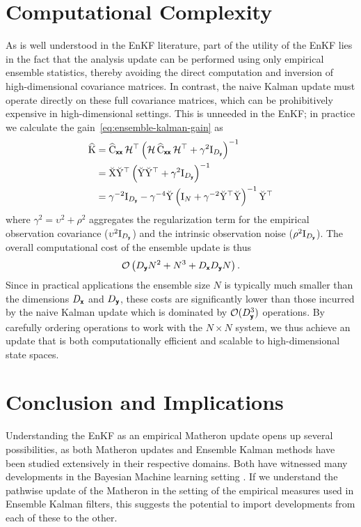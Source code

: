 \documentclass[wcp]{jmlr} %
\begin{document}
\section{Computational Complexity}
As is well understood in the EnKF literature, part of the  utility  of the EnKF lies in the fact that the analysis update can be performed using only empirical ensemble statistics, thereby avoiding the direct computation and inversion of high-dimensional covariance matrices.
In contrast, the naive Kalman update must operate directly on these full covariance matrices, which can be prohibitively expensive in high-dimensional settings.
This is unneeded in the EnKF; in practice we calculate the gain~\eqref{eq:ensemble-kalman-gain} as
\begin{align}
    \widehat{\mathrm{K}}&= \widehat{\mathrm{C}}_{\boldsymbol{\mathsf{xx}}}\, \mathcal{H}^\top \left(\mathcal{H}\,\widehat{\mathrm{C}}_{\boldsymbol{\mathsf{xx}}}\,\mathcal{H}^\top + \gamma^2\mathrm{I}_{D_{\boldsymbol{\mathsf{y}}}}\right)^{-1}\\
    &= \breve{\mathrm{X}} \breve{\mathrm{Y}}^\top   \left(
        \breve{\mathrm{Y}} \breve{\mathrm{Y}}^\top + \gamma^2 \mathrm{I}_{D_{\boldsymbol{\mathsf{y}}}}
    \right)^{-1}\\
    &= \gamma^{-2}\mathrm{I}_{D_{\boldsymbol{\mathsf{y}}}}
    - \gamma^{-4}\breve{\mathrm{Y}}
    \left(
        \mathrm{I}_N + \gamma^{-2}\breve{\mathrm{Y}}^\top\breve{\mathrm{Y}}
    \right)^{-1}
    \breve{\mathrm{Y}}^\top
\end{align}
where \(\gamma^2 = \upsilon^2 + \rho^2\) aggregates the regularization term for the empirical observation covariance (\(\upsilon^2\mathrm{I}_{D_{\boldsymbol{\mathsf{y}}}}\)) and the intrinsic observation noise (\(\rho^2\mathrm{I}_{D_{\boldsymbol{\mathsf{y}}}}\)).
%
The overall computational cost of the ensemble update is thus
\[
    \mathcal{O}\left(D_{\boldsymbol{\mathsf{y}}}N^2 + N^3 + D_{\boldsymbol{\mathsf{x}}}D_{\boldsymbol{\mathsf{y}}}N\right).
\]
Since in practical applications the ensemble size \(N\) is typically much smaller than the dimensions \(D_{\boldsymbol{\mathsf{x}}}\) and \(D_{\boldsymbol{\mathsf{y}}}\), these costs are significantly lower than those incurred by the naive Kalman update which is dominated by \(\mathcal{O}(D_{\boldsymbol{\mathsf{y}}}^3)\) operations.
By carefully ordering operations to work with the \(N\times N\) system, we thus achieve an update that is both computationally efficient and scalable to high-dimensional state spaces.

\section{Conclusion and Implications}

Understanding the EnKF as an empirical Matheron update opens up several possibilities, as both Matheron updates and Ensemble Kalman methods have been studied extensively in their respective domains.
Both have witnessed many developments in the Bayesian Machine learning setting
\citep{Alzraiee2022Scalable,Chada2022Convergence,Chen2021Autodifferentiable,Chen2023Reducedorder,Dunbar2022Ensemble,Guth2020Ensemble,Huang2022Iterated,Kovachki2019Ensemble,MacKinlay2025Gaussian,Oliver2022Hybrid,Schillings2017Analysis,Schneider2022Ensemble,Spantini2022Coupling}.
If we understand the pathwise update of the Matheron in the setting of the empirical measures used in Ensemble Kalman filters, this suggests the potential to import developments from each of these to the other.
\end{document}
